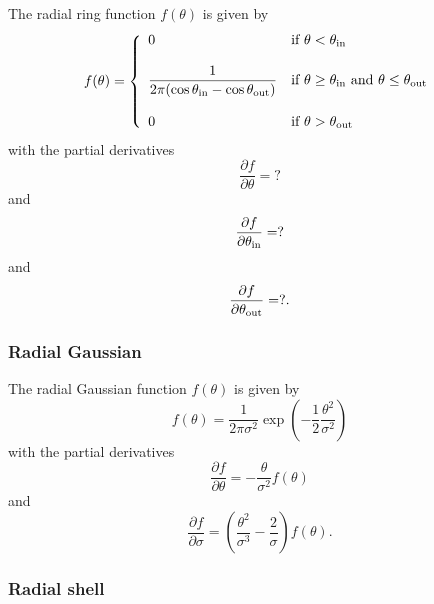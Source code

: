 \documentclass{article}[12pt,a4]
\begin{document}
The radial ring function $f(\theta)$ is given by
\begin{equation}
f(\theta) = \left \{
   \begin{array}{l l}
     \displaystyle 0 & \mbox{if $\theta < \theta_{\rm in}$} \\ \\
     \displaystyle \frac{1}{2 \pi (\cos \theta_{\rm in} - \cos \theta_{\rm out})} & \mbox{if $\theta \ge \theta_{\rm in}$ and $\theta \le \theta_{\rm out}$} \\ \\
     \displaystyle 0 & \mbox{if $\theta > \theta_{\rm out}$}
   \end{array}
   \right .
\end{equation}
with the partial derivatives
\begin{equation}
\frac{\partial f}{\partial \theta}  = ?
\end{equation}
and
\begin{equation}
\frac{\partial f}{\partial \theta_{\rm in}}  = ?
\end{equation}
and
\begin{equation}
\frac{\partial f}{\partial \theta_{\rm out}}  = ? .
\end{equation}

\subsubsection{Radial Gaussian}

The radial Gaussian function $f(\theta)$ is given by
\begin{equation}
f(\theta) = \frac{1}{2 \pi \sigma^2} \exp \left( -\frac{1}{2} \frac{\theta^2}{\sigma^2} \right)
\end{equation}
with the partial derivatives
\begin{equation}
\frac{\partial f}{\partial \theta}  = - \frac{\theta}{\sigma^2} f(\theta)
\end{equation}
and
\begin{equation}
\frac{\partial f}{\partial \sigma}  = \left( \frac{\theta^2}{\sigma^3} - \frac{2}{\sigma} \right) f(\theta) .
\end{equation}

\subsubsection{Radial shell}
\end{document}
